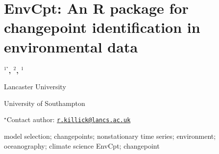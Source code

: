 \documentclass[\main/boa.tex]{subfiles}
\begin{document}
\section{EnvCpt: An R package for changepoint identification in environmental
data}

\begin{center}
  {\bf {}$^{1^\star}$, $^{2}$, $^{1}$}
\end{center}

\vskip 0.3cm

\begin{affiliations}
\begin{enumerate}
\begin{minipage}{0.915\textwidth}
\centering
\item Lancaster University \\[-2pt]
\item University of Southampton \\[-2pt]
\end{minipage}
\end{enumerate}
$^\star$Contact author: \href{mailto:r.killick@lancs.ac.uk}{\nolinkurl{r.killick@lancs.ac.uk}}\\
\end{affiliations}

\vskip 0.5cm

\begin{minipage}{0.915\textwidth}
\keywords model selection; changepoints; nonstationary time series; environment;
oceanography; climate science
\packages EnvCpt; changepoint
\end{minipage}

\vskip 0.8cm
\end{document}
